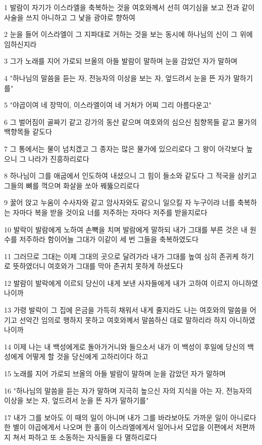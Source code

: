 \par 1 발람이 자기가 이스라엘을 축복하는 것을 여호와께서 선히 여기심을 보고 전과 같이 사술을 쓰지 아니하고 그 낯을 광야로 향하여
\par 2 눈을 들어 이스라엘이 그 지파대로 거하는 것을 보는 동시에 하나님의 신이 그 위에 임하신지라
\par 3 그가 노래를 지어 가로되 브올의 아들 발람이 말하며 눈을 감았던 자가 말하며
\par 4 "하나님의 말씀을 듣는 자, 전능자의 이상을 보는 자, 엎드려서 눈을 뜬 자가 말하기를"
\par 5 "야곱이여 네 장막이, 이스라엘이여 네 거처가 어찌 그리 아름다운고"
\par 6 그 벌어짐이 골짜기 같고 강가의 동산 같으며 여호와의 심으신 침향목들 같고 물가의 백향목들 같도다
\par 7 그 통에서는 물이 넘치겠고 그 종자는 많은 물가에 있으리로다 그 왕이 아각보다 높으니 그 나라가 진흥하리로다
\par 8 하나님이 그를 애굽에서 인도하여 내셨으니 그 힘이 들소와 같도다 그 적국을 삼키고 그들의 뼈를 꺽으며 화살을 쏘아 꿰뚫으리로다
\par 9 꿇어 앉고 누움이 수사자와 같고 암사자와도 같으니 일으킬 자 누구이랴 너를 축복하는 자마다 복을 받을 것이요 너를 저주하는 자마다 저주를 받을지로다
\par 10 발락이 발람에게 노하여 손뼉을 치며 발람에게 말하되 내가 그대를 부른 것은 내 원수를 저주하라 함이어늘 그대가 이같이 세 번 그들을 축복하였도다
\par 11 그러므로 그대는 이제 그대의 곳으로 달려가라 내가 그대를 높여 심히 존귀케 하기로 뜻하였더니 여호와가 그대를 막아 존귀치 못하게 하셨도다
\par 12 발람이 발락에게 이르되 당신이 내게 보낸 사자들에게 내가 고하여 이르지 아니하였나이까
\par 13 가령 발락이 그 집에 은금을 가득히 채워서 내게 줄지라도 나는 여호와의 말씀을 어기고 선악간 임의로 행하지 못하고 여호와께서 말씀하신 대로 말하리라 하지 아니하였나이까
\par 14 이제 나는 내 백성에게로 돌아가거니와 들으소서 내가 이 백성이 후일에 당신의 백성에게 어떻게 할 것을 당신에게 고하리이다 하고
\par 15 노래를 지어 가로되 브올의 아들 발람이 말하며 눈을 감았던 자가 말하며
\par 16 "하나님의 말씀을 듣는 자가 말하며 지극히 높으신 자의 지식을 아는 자, 전능자의 이상을 보는 자, 엎드려서 눈을 뜬 자가 말하기를"
\par 17 내가 그를 보아도 이 때의 일이 아니며 내가 그를 바라보아도 가까운 일이 아니로다 한 별이 야곱에게서 나오며 한 홀이 이스라엘에게서 일어나서 모압을 이편에서 저편까지 쳐서 파하고 또 소동하는 자식들을 다 멸하리로다
